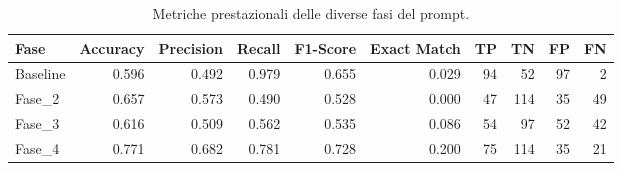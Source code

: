 \begin{table}
\caption{Metriche prestazionali delle diverse fasi del prompt.}
\label{tab:metriche}
\begin{tabular}{lrrrrrrrrr}
\toprule
Fase & Accuracy & Precision & Recall & F1-Score & Exact Match & TP & TN & FP & FN \\
\midrule
Baseline & 0.596 & 0.492 & 0.979 & 0.655 & 0.029 & 94 & 52 & 97 & 2 \\
Fase_2 & 0.657 & 0.573 & 0.490 & 0.528 & 0.000 & 47 & 114 & 35 & 49 \\
Fase_3 & 0.616 & 0.509 & 0.562 & 0.535 & 0.086 & 54 & 97 & 52 & 42 \\
Fase_4 & 0.771 & 0.682 & 0.781 & 0.728 & 0.200 & 75 & 114 & 35 & 21 \\
\bottomrule
\end{tabular}
\end{table}
